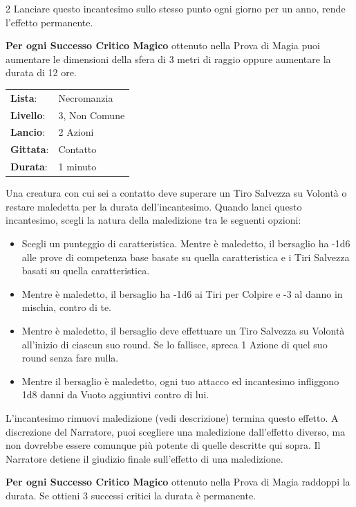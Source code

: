 \begin{multicols}{2}
Lanciare questo incantesimo sullo stesso punto ogni giorno per un anno, rende l'effetto permanente.

\textbf{Per ogni Successo Critico Magico} ottenuto nella Prova di Magia puoi aumentare le dimensioni della sfera di 3 metri di raggio oppure aumentare la durata di 12 ore.

\noindent\begin{tabularx}{\linewidth}{p{1.9cm}X}
	\rowcolor{gray!20}\textbf{Lista}: & Necromanzia \\
	\textbf{Livello}: & 3, Non Comune \\
	\rowcolor{gray!20}\textbf{Lancio}: & 2 Azioni \\
	\textbf{Gittata}: & Contatto \\
	\rowcolor{gray!20}\textbf{Durata}: & 1 minuto \\
\end{tabularx}\smallskip

Una creatura con cui sei a contatto deve superare un Tiro Salvezza su Volontà o restare maledetta per la durata dell'incantesimo. Quando lanci questo incantesimo, scegli la natura della maledizione tra le seguenti opzioni:

\begin{itemize}[leftmargin=*] \setlength{\itemsep}{0pt}
	\item Scegli un punteggio di caratteristica. Mentre è maledetto, il bersaglio ha -1d6 alle prove di competenza base basate su quella caratteristica e i Tiri Salvezza basati su quella caratteristica.
	\item Mentre è maledetto, il bersaglio ha -1d6 ai Tiri per Colpire e -3 al danno in mischia, contro di te.
	\item Mentre è maledetto, il bersaglio deve effettuare un Tiro Salvezza su Volontà all'inizio di ciascun suo round. Se lo fallisce, spreca 1 Azione di quel suo round senza fare nulla.
	\item Mentre il bersaglio è maledetto, ogni tuo attacco ed incantesimo infliggono 1d8 danni da Vuoto aggiuntivi contro di lui.
\end{itemize}

L'incantesimo rimuovi maledizione (vedi descrizione) termina questo effetto. A discrezione del Narratore, puoi scegliere una maledizione dall'effetto diverso, ma non dovrebbe essere comunque più potente di quelle descritte qui sopra. Il Narratore detiene il giudizio finale sull'effetto di una maledizione.

\textbf{Per ogni Successo Critico Magico} ottenuto nella Prova di Magia raddoppi la durata. Se ottieni 3 successi critici la durata è permanente.


\end{multicols}
